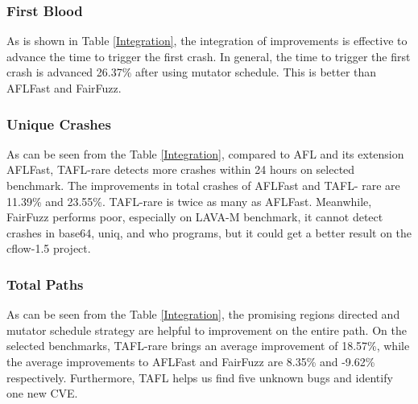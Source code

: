\subsubsection{First Blood}
As is shown in Table \ref{Integration}, the integration of improvements is effective to advance the time to trigger the first crash. In general, the time to trigger the first crash is advanced 26.37\% after using mutator schedule. This is better than AFLFast and FairFuzz.%

\subsubsection{Unique Crashes}
As can be seen from the Table \ref{Integration}, compared to AFL and its extension AFLFast, TAFL-rare detects more crashes within 24 hours on selected benchmark. The improvements in total crashes of AFLFast and TAFL- rare are 11.39\% and 23.55\%. TAFL-rare is twice as many as AFLFast. Meanwhile, FairFuzz performs poor, especially on LAVA-M benchmark, it cannot detect crashes in base64, uniq, and who programs, but it could get a better result on the cflow-1.5 project.

\subsubsection{Total Paths}
As can be seen from the Table \ref{Integration}, the promising regions directed and mutator schedule strategy are helpful to improvement on the entire path. On the selected benchmarks, TAFL-rare brings an average improvement of 18.57\%, while the average improvements to AFLFast and FairFuzz are 8.35\% and -9.62\% respectively. Furthermore, TAFL helps us find five unknown bugs and identify one new CVE\cite{bugs}. 
